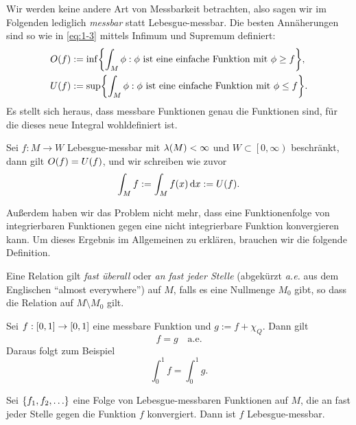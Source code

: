 Wir werden keine andere Art von Messbarkeit betrachten, also sagen wir im Folgenden lediglich \emph{messbar} statt Lebesgue-messbar.
Die besten Annäherungen sind so wie in \eqref{eq:1-3} mittels Infimum und Supremum definiert:
\begin{align}
	O\parentheses*{f} &:= \inf\braces*{\int_M \phi : \phi\text{ ist eine einfache Funktion mit }\phi \ge f},\\
	U\parentheses*{f} &:= \sup\braces*{\int_M \phi : \phi\text{ ist eine einfache Funktion mit }\phi \le f}.
\end{align}
Es stellt sich heraus, dass messbare Funktionen genau die Funktionen sind, für die dieses neue Integral wohldefiniert ist.

\begin{proposition}
	Sei \(f: M \to W\) Lebesgue-messbar mit \(\lambda\parentheses*{M} < \infty\) und \(W \subset \left[0, \infty\right)\) beschränkt, dann gilt \(O\parentheses*{f} = U\parentheses*{f}\), und wir schreiben wie zuvor
	\[
		\int_M f := \int_M f\parentheses*{x}\d x := U\parentheses*{f}.
	\]
\end{proposition}

Außerdem haben wir das Problem nicht mehr, dass eine Funktionenfolge von integrierbaren Funktionen gegen eine nicht integrierbare Funktion konvergieren kann.
Um dieses Ergebnis im Allgemeinen zu erklären, brauchen wir die folgende Definition.

\begin{definition}
	Eine Relation gilt \emph{fast überall} oder \emph{an fast jeder Stelle} (abgekürzt \emph{a.e.} aus dem Englischen ``almost everywhere'') auf \(M\), falls es eine Nullmenge \(M_0\) gibt, so dass die Relation auf \(M \setminus M_0\) gilt.
\end{definition}

\begin{example}
	Sei \(f: \brackets*{0, 1} \to \brackets*{0, 1}\) eine messbare Funktion und \(g := f + \chi_Q\).
	Dann gilt
	\[
		f = g \quad \text{a.e.}
	\]
	Daraus folgt zum Beispiel
	\[
		\int_0^1 f = \int_0^1 g.
	\]
\end{example}

\begin{proposition}\label{prop:1-12}
	Sei \(\braces*{f_1, f_2, \ldots}\) eine Folge von Lebesgue-messbaren Funktionen auf \(M\), die an fast jeder Stelle gegen die Funktion \(f\) konvergiert.
	Dann ist \(f\) Lebesgue-messbar.
\end{proposition}

